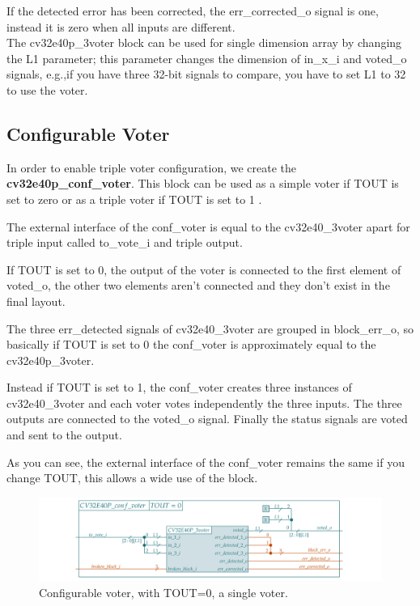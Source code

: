 {{{           If the detected error has been corrected, the err\_corrected\_o signal is one, instead it is zero when all inputs are different.\\
            
            The cv32e40p\_3voter block can be used for single dimension array by changing the L1 parameter; this parameter changes the dimension of in\_x\_i and voted\_o signals, e.g.,if you have three 32-bit signals to compare, you have to set L1 to 32 to use the voter.\\
        
        }%
        
        \subsection{Configurable Voter}{
            In order to enable triple voter configuration, we create the \textbf{cv32e40p\_conf\_voter}.
            This block can be used as a simple voter if TOUT is set to zero   or as a triple voter if TOUT is set to 1  .
            
            The external interface of the conf\_voter is equal to the cv32e40\_3voter apart for triple input called to\_vote\_i and triple output. 
            
            
            If TOUT is set to 0, the  output of the voter is connected to the first element of voted\_o, the other two elements aren't connected and they don't exist in the final layout.
            
            The three err\_detected signals of cv32e40\_3voter are grouped in block\_err\_o, so basically if TOUT is set to 0 the conf\_voter is approximately equal to the cv32e40p\_3voter.
            
            Instead if TOUT is set to 1, the conf\_voter creates three instances of cv32e40\_3voter and each voter votes independently the three inputs. The three outputs are connected to the voted\_o signal. 
            Finally the status signals are voted and sent to the output.
            
            As you can see, the external interface of the conf\_voter remains the same if you change TOUT, this allows a wide use of the block.\\
            
    	    \begin{figure}[H]
        		\centering
        		\includegraphics[width=1.3\textwidth,center]{./images/cv32e40p_conf_voter.png}
        		\caption{Configurable voter, with TOUT=0, a single voter.}
        		\label{fig:cv32e40p_conf_voter}
        	\end{figure} 	
        	
}}}
